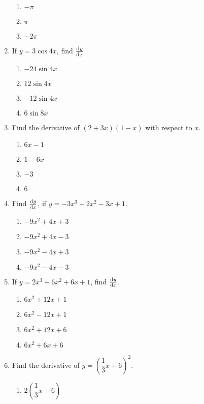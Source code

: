 \begin{multicols}{2}
\begin{enumerate}[label={\arabic*.}]
\begin{enumerate}[label={\Alph*.}]
        \item \(-\pi\)
        \item \(\pi\)
        \item \(-2\pi\)
      \end{enumerate}
    \item If \(y=3\cos{4x}\), find \(\frac{\mathrm{d}y}{\mathrm{d}x}\)
      \begin{enumerate}[label={\Alph*.}]
        \item \(-24\sin{4x}\)
        \item \(12\sin{4x}\)
        \item \(-12 \sin{4x}\)
        \item \(6\sin{8x}\)
      \end{enumerate}
    \item Find the derivative of \((2+3x)(1-x)\) with respect to \(x\).
      \begin{enumerate}[label={\Alph*.}]
        \item \(6x-1\)
        \item \(1-6x\)
        \item \(-3\)
        \item \(6\)
      \end{enumerate}
    \item Find \(\frac{\mathrm{d}y}{\mathrm{d}x}\), if \(y = -3{x}^{3}+2{x}^{2}-3x+1\).
      \begin{enumerate}[label={\Alph*.}]
        \item \(-9{x}^{2}+4{x}+3\)
        \item \(-9{x}^{2}+4{x}-3\)
        \item \(-9{x}^{2}-4{x}+3\)
        \item \(-9{x}^{2}-4{x}-3\)
      \end{enumerate}
    \item If \(y = 2{x}^{3}+6{x}^{2}+6x+1\), find \(\frac{\mathrm{d}y}{\mathrm{d}x}\).
      \begin{enumerate}[label={\Alph*.}]
        \item \(6{x}^{2}+12{x}+1\)
        \item \(6{x}^{2}-12{x}+1\)
        \item \(6{x}^{2}+12{x}+6\)
        \item \(6{x}^{2}+6{x}+6\)
      \end{enumerate}
    \item Find the derivative of \(y ={\left(\dfrac{1}{3}x + 6\right)}^{2}\).
      \begin{enumerate}[label={\Alph*.}]
        \item \(2{\left(\dfrac{1}{3}x + 6\right)}\)

\end{enumerate}
\end{enumerate}
\end{multicols}
